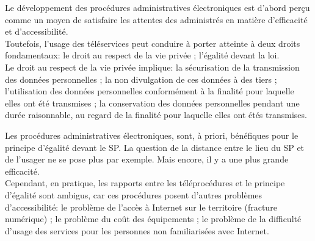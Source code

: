 \documentclass[10pt, a4paper, openany]{book}
\begin{document}
Le développement des procédures administratives électroniques est d'abord perçu comme un moyen de satisfaire les attentes des administrés en matière d'efficacité et d'accessibilité. \\
Toutefois, l'usage des téléservices peut conduire à porter atteinte à deux droits fondamentaux: le droit au respect de la vie privée ; l'égalité devant la loi. \\
Le droit au respect de la vie privée implique: la sécurisation de la transmission des données personnelles ; la non divulgation de ces données à des tiers ; l'utilisation des données personnelles conformément à la finalité pour laquelle elles ont été transmises ; la conservation des données personnelles pendant une durée raisonnable, au regard de la finalité pour laquelle elles ont étés transmises. 


Les procédures administratives électroniques, sont, à priori, bénéfiques pour le principe d'égalité devant le SP. La question de la distance entre le lieu du SP et de l'usager ne se pose plus par exemple. Mais encore, il y a une plus grande efficacité. \\
Cependant, en pratique, les rapports entre les téléprocédures et le principe d'égalité sont ambigus, car ces procédures posent d'autres problèmes d'accessibilité: le problème de l'accès à Internet sur le territoire (fracture numérique) ; le problème du coût des équipements ; le problème de la difficulté d'usage des services pour les personnes non familiarisées avec Internet. 
\end{document}
